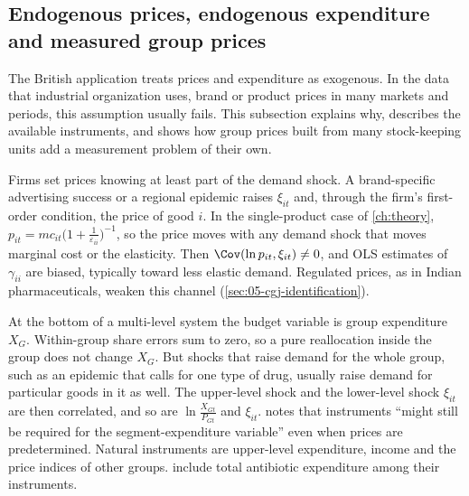 \subsection{Endogenous prices, endogenous expenditure and measured group prices}\label{sec:05-endogeneity}

The British application treats prices and expenditure as exogenous. In the data that industrial
organization uses, brand or product prices in many markets and periods, this assumption usually fails.
This subsection explains why, describes the available instruments, and shows how group prices built from
many stock-keeping units add a measurement problem of their own.

Firms set prices knowing at least part of the demand shock. A brand-specific advertising success or a
regional epidemic raises $\xi_{it}$ and, through the firm's first-order condition, the price of good $i$.
In the single-product case of \cref{ch:theory}, $p_{it} = mc_{it}\bigl(1 +
\frac{1}{\varepsilon_{ii}}\bigr)^{-1}$, so the price moves with any demand shock that moves marginal cost
or the elasticity. Then $\Cov(\ln p_{it}, \xi_{it}) \neq 0$, and OLS estimates of $\gamma_{ii}$ are biased,
typically toward less elastic demand. Regulated prices, as in Indian pharmaceuticals, weaken this channel
(\cref{sec:05-cgj-identification}).

At the bottom of a multi-level system the budget variable is group expenditure $X_G$. Within-group share
errors sum to zero, so a pure reallocation inside the group does not change $X_G$. But shocks that raise
demand for the whole group, such as an epidemic that calls for one type of drug, usually raise demand
for particular goods in it as well. The upper-level shock and the lower-level shock
$\xi_{it}$ are then correlated, and so are $\ln\frac{X_{Gt}}{P_{Gt}}$ and $\xi_{it}$.
\citet[p.~219]{Hausman1997} notes that instruments ``might still be required for the segment-expenditure
variable'' even when prices are predetermined. Natural instruments are upper-level expenditure, income
and the price indices of other groups. \citet{ChaudhuriGoldbergJia2006} include total antibiotic
expenditure among their instruments.

